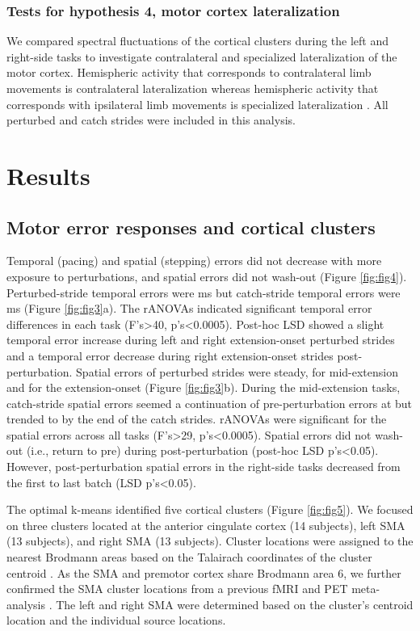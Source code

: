 \documentclass[../thesis_seyed.tex]{subfiles}
\begin{document}
\subsubsection{Tests for hypothesis 4, motor cortex lateralization}
We compared spectral fluctuations of the cortical clusters during the left and right-side tasks to investigate contralateral and specialized lateralization of the motor cortex. Hemispheric activity that corresponds to contralateral limb movements is contralateral lateralization whereas hemispheric activity that corresponds with ipsilateral limb movements is specialized lateralization \cite{Mutha2014-ea}. All perturbed and catch strides were included in this analysis. 

\section{Results}
\label{sec:methods}
\subsection{Motor error responses and cortical clusters}
{Temporal (pacing) and spatial (stepping) errors did not decrease with more exposure to perturbations, and spatial errors did not wash-out (Figure \ref{fig:fig4}). Perturbed-stride temporal errors were  ms but catch-stride temporal errors were  ms (Figure \ref{fig:fig3}a). The rANOVAs indicated significant temporal error differences in each task} (F's>40, p's<0.0005). {Post-hoc LSD showed a slight temporal error increase during left and right extension-onset perturbed strides and a temporal error decrease during right extension-onset strides post-perturbation. Spatial errors of perturbed strides were steady, \textdegree{} for mid-extension and \textdegree{} for the extension-onset (Figure \ref{fig:fig3}b). During the mid-extension tasks, catch-stride spatial errors seemed a continuation of pre-perturbation errors at \textdegree{} but trended to \textdegree{} by the end of the catch strides. rANOVAs were significant for the spatial errors across all tasks} (F's>29, p's<0.0005).{ Spatial errors did not wash-out (i.e., return to pre) during post-perturbation (post-hoc LSD p's<0.05). However, post-perturbation spatial errors in the right-side tasks decreased from the first to last batch (LSD p's<0.05).}

The optimal k-means identified five cortical clusters (Figure \ref{fig:fig5}). We focused on three clusters located at the anterior cingulate cortex (14 subjects), left SMA (13 subjects), and right SMA (13 subjects). Cluster locations were assigned to the nearest Brodmann areas based on the Talairach coordinates of the cluster centroid \cite{Shirazi2019-im}. As the SMA and premotor cortex share Brodmann area 6, we further confirmed the SMA cluster locations from a previous fMRI and PET meta-analysis \cite{Mayka2006-ye}. The left and right SMA were determined based on the cluster’s centroid location and the individual source locations.
\end{document}

